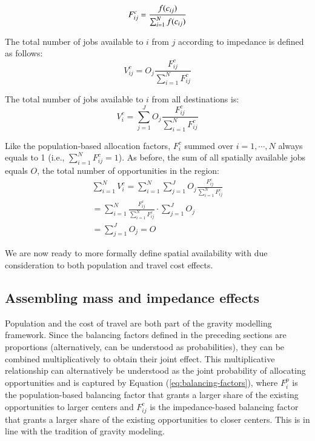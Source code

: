 \documentclass[]{elsarticle} %
\begin{document}
\begin{equation}
\label{eq:impedance-balancing-factor}
F^c_{ij} = \frac{f(c_{ij})}{\sum_{i=1}^N f(c_{ij})}\\
\end{equation}

The total number of jobs available to \(i\) from \(j\) according to
impedance is defined as follows: \[
V^c_{ij} = O_j\frac{F^c_{ij}}{\sum_{i=1}^N F^c_{ij}}
\]

The total number of jobs available to \(i\) from all destinations is: \[
V^c_{i} = \sum_{j=1}^J O_j\frac{F^c_{ij}}{\sum_{i=1}^N F^c_{ij}}
\]

Like the population-based allocation factors, \(F^c_{i}\) summed over
\(i=1,\cdots,N\) always equals to 1 (i.e.,
\(\sum_{i=1}^{N} F^c_{ij} = 1\)). As before, the sum of all spatially
available jobs equals \(O\), the total number of opportunities in the
region: \[
\begin{array}{l}
\sum_{i=1}^N V^c_i =\sum_{i=1}^N\sum_{j=1}^JO_j\frac{F^c_{ij}}{\sum_{i=1}^N F^c_{ij}}\\
=\sum_{i=1}^N \frac{F^c_{ij}}{\sum_{i=1}^N F^c_{ij}}\cdot\sum_{j=1}^JO_j\\
=\sum_{j=1}^J O_j = O
\end{array}
\]

We are now ready to more formally define spatial availability with due
consideration to both population and travel cost effects.

\hypertarget{assembling-mass-and-impedance-effects}{%
\subsection{Assembling mass and impedance
effects}\label{assembling-mass-and-impedance-effects}}

Population and the cost of travel are both part of the gravity modelling
framework. Since the balancing factors defined in the preceding sections
are proportions (alternatively, can be understood as probabilities),
they can be combined multiplicatively to obtain their joint effect. This
multiplicative relationship can alternatively be understood as the joint
probability of allocating opportunities and is captured by Equation
(\ref{eq:balancing-factors}), where \(F^p_{i}\) is the population-based
balancing factor that grants a larger share of the existing
opportunities to larger centers and \(F^c_{ij}\) is the impedance-based
balancing factor that grants a larger share of the existing
opportunities to closer centers. This is in line with the tradition of
gravity modeling.
\end{document}

